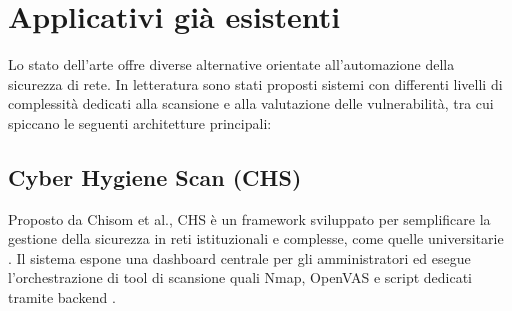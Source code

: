 \documentclass{article}
\begin{document}
\section{Applicativi già esistenti}
Lo stato dell'arte offre diverse alternative orientate all'automazione della sicurezza di rete. In letteratura sono stati proposti sistemi con differenti livelli di complessità dedicati alla scansione e alla valutazione delle vulnerabilità, tra cui spiccano le seguenti architetture principali:

\subsection{Cyber Hygiene Scan (CHS)}
Proposto da Chisom et al., CHS è un framework sviluppato per semplificare la gestione della sicurezza in reti istituzionali e complesse, come quelle universitarie \cite{chisom_cyberhygienescan_2025}. Il sistema espone una dashboard centrale per gli amministratori ed esegue l'orchestrazione di tool di scansione quali Nmap, OpenVAS e script dedicati tramite backend \cite{chisom_cyberhygienescan_2025}.
\end{document}
